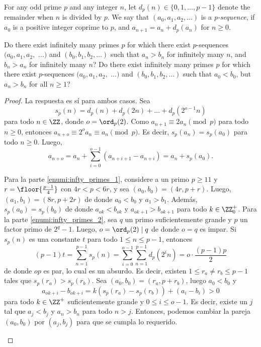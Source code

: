 \begin{probMG}[ISL 2020/N4]
  For any odd prime $p$ and any integer $n$, let $d_p(n)\in\{0,1,\dots,p-1\}$
  denote the remainder when $n$ is divided by $p$. We say that
  $(a_0,a_1,a_2,\dots)$ is a \emph{p-sequence}, if $a_0$ is a positive integer
  coprime to $p$, and $a_{n+1}=a_n+d_p(a_n)$ for $n\ge 0$.
  \begin{enumerate}[(a)]
    \ii \label{enumi:infty_primes_1} Do there exist infinitely many primes $p$
    for which there exist $p$-sequences $(a_0,a_1,a_2,$ $\dots)$ and
    $(b_0,b_1,b_2,\dots)$ such that $a_n>b_n$ for infinitely many $n$, and
    $b_n>a_n$ for infinitely many $n$?
    \ii \label{enumi:infty_primes_2} Do there exist infinitely many primes $p$
    for which there exist $p$-sequences $(a_0,a_1,a_2,$ $\dots)$ and
    $(b_0,b_1,b_2,\dots)$ such that $a_0<b_0$, but $a_n>b_n$ for all $n\ge 1$?
  \end{enumerate}
\end{probMG}

\begin{proof}
  La respuesta es sí para ambos casos. Sea
  \[s_p(n)=d_p(n)+d_p(2n)+\dots+d_p(2^{o-1}n)\]
  para todo $n\in\ZZ$, donde $o=\ord_{p}(2)$. Como $a_{n+1}\equiv 2a_n\pmod p$
  para todo $n\ge 0$, entonces $a_{n+o}\equiv 2^oa_n\equiv a_n\pmod p$. Es
  decir, $s_p(a_n)=s_p(a_0)$ para todo $n\ge 0$. Luego,
  \[a_{n+o}=a_n+\sum_{i=0}^{o-1}(a_{n+i+1}-a_{n+i})=a_n+s_p(a_0).\]
  \begin{itemize}
    \ii Para la parte \ref{enumi:infty_primes_1}, considere a un primo $p\ge 11$
    y $r=\floor{\frac{p-1}{4}}$ con $4r<p<6r$, y sea $(a_0,b_0)=(4r,p+r)$.
    Luego, $(a_1,b_1)=(8r,p+2r)$ de donde $a_0<b_0$ y $a_1>b_1$. Además,
    $s_p(a_0)=s_p(b_0)$ de donde $a_{ok}<b_{ok}$ y $a_{ok+1}>b_{ok+1}$ para todo
    $k\in\ZZ^+_0$.
    \ii Para la parte \ref{enumi:infty_primes_2}, sea $q$ un primo
    suficientemente grande y $p$ un factor primo de $2^q-1$. Luego,
    $o=\ord_p(2)\mid q$ de donde $o=q$ es impar. Si $s_p(n)$ es una constante
    $t$ para todo $1\le n\le p-1$, entonces
    \[
      (p-1)t
      =\sum_{n=1}^{p-1}s_p(n)
      =\sum_{i=0}^{o-1}\sum_{n=1}^{p-1}d_p(2^in)
      =o\cdot\frac{(p-1)p}{2}
    \]
    de donde $op$ es par, lo cual es un absurdo. Es decir, existen
    $1\le r_a\ne r_b\le p-1$ tales que $s_p(r_a)>s_p(r_b)$. Sea
    $(a_0,b_0)=(r_a,p+r_b)$, luego $a_0<b_0$ y
    \[a_{ok+i}-b_{ok+i}=k(s_p(r_a)-s_p(r_b))+(a_i-b_i)>0\]
    para todo $k\in\ZZ^+$ suficientemente grande y $0\le i\le o-1$. Es decir,
    existe un $j$ tal que $a_j<b_j$ y $a_n>b_n$ para todo $n>j$. Entonces,
    podemos cambiar la pareja $(a_0,b_0)$ por $(a_j,b_j)$ para que se cumpla lo
    requerido.
  \end{itemize}
\end{proof}

